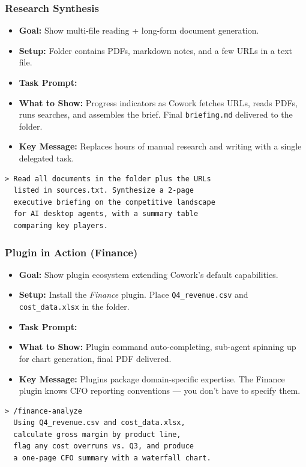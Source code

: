 \begin{frame}[fragile]\frametitle{Research Synthesis}
  \begin{itemize}
    \item \textbf{Goal:} Show multi-file reading + long-form document generation.
    \item \textbf{Setup:} Folder contains PDFs, markdown notes, and a few URLs in a text file.
    \item \textbf{Task Prompt:}
    \item \textbf{What to Show:} Progress indicators as Cowork fetches URLs, reads PDFs, runs searches, and assembles the brief. Final \texttt{briefing.md} delivered to the folder.
    \item \textbf{Key Message:} Replaces hours of manual research and writing with a single delegated task.
  \end{itemize}
\begin{lstlisting}
> Read all documents in the folder plus the URLs
  listed in sources.txt. Synthesize a 2-page
  executive briefing on the competitive landscape
  for AI desktop agents, with a summary table
  comparing key players.
\end{lstlisting}
\end{frame}

\begin{frame}[fragile]\frametitle{Plugin in Action (Finance)}
  \begin{itemize}
    \item \textbf{Goal:} Show plugin ecosystem extending Cowork's default capabilities.
    \item \textbf{Setup:} Install the \textit{Finance} plugin. Place \texttt{Q4\_revenue.csv} and \texttt{cost\_data.xlsx} in the folder.
    \item \textbf{Task Prompt:}
    \item \textbf{What to Show:} Plugin command auto-completing, sub-agent spinning up for chart generation, final PDF delivered.
    \item \textbf{Key Message:} Plugins package domain-specific expertise. The Finance plugin knows CFO reporting conventions — you don't have to specify them.
  \end{itemize}
\begin{lstlisting}
> /finance-analyze
  Using Q4_revenue.csv and cost_data.xlsx,
  calculate gross margin by product line,
  flag any cost overruns vs. Q3, and produce
  a one-page CFO summary with a waterfall chart.
\end{lstlisting}
\end{frame}

